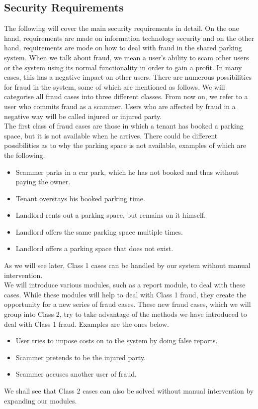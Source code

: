 \documentclass[
a4paper,     %
titlepage,   %
14pt         %
]{scrartcl}  %
\theoremstyle{mystyle}
\begin{document}
\subsection{Security Requirements}
The following will cover the main security requirements in detail.
On the one hand, requirements are made on information technology security and on the other hand, requirements are mode on how to deal with fraud in the shared parking system. When we talk about fraud, we mean a user's ability to scam other users or the system using its normal functionality in order to gain a profit. In many cases, this has a negative impact on other users. There are numerous possibilities for fraud in the system, some of which are mentioned as follows. We will categorise all fraud cases into three different classes. From now on, we refer to a user who commits fraud as a scammer. Users who are affected by fraud in a negative way will be called injured or injured party. \\

The first class of fraud cases are those in which a tenant has booked a parking space, but  it is not available when he arrives. There could be different possibilities as to why the parking space is not available, examples of which are the following.
\begin{itemize}
\item Scammer parks in a car park, which he has not booked and thus without paying the owner.
\item Tenant overstays his booked parking time.
\item Landlord rents out a parking space, but remains on it himself.
\item Landlord offers the same parking space multiple times.
\item Landlord offers a parking space that does not exist.
\end{itemize}
As we will see later, Class 1 cases can be handled by our system without manual intervention. \\

We will introduce various modules, such as a report module, to deal with these cases. While these modules will help to deal with Class 1 fraud, they create the opportunity for a new series of fraud cases. These new fraud cases, which we will group into Class 2, try to take advantage of the methods we have introduced to deal with Class 1 fraud. Examples are the ones below.
\begin{itemize}
\item User tries to impose costs on to the system by doing false reports.
\item Scammer pretends to be the injured party.
\item Scammer accuses another user of fraud.
\end{itemize}
We shall see that Class 2 cases can also be solved without manual intervention by expanding our modules. \\
\end{document}
